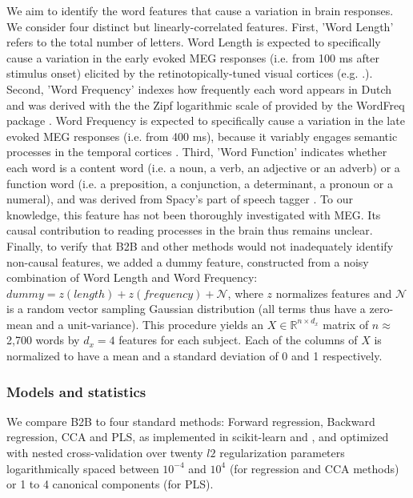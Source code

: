 We aim to identify the word features that cause a variation in brain responses.
We consider four distinct but linearly-correlated features.
%
First, 'Word Length' refers to the total number of letters. Word Length is
expected to specifically cause a variation in the early evoked MEG responses
(i.e. from 100 ms after stimulus onset) elicited by the retinotopically-tuned
visual cortices (e.g. \citep{pegado2014timing}.).
%
Second, 'Word Frequency' indexes how frequently each word appears in Dutch and
was derived with the the Zipf logarithmic scale of \citep{van2014subtlex}
provided by the WordFreq package \citep{speerwordfreq}. Word Frequency is
expected to specifically cause a variation in the late evoked MEG responses
(i.e. from 400 ms), because it variably engages semantic processes in the
temporal cortices \citep{kutas2011thirty}.
%
Third, 'Word Function' indicates whether each word is a content word (i.e. a
noun, a verb, an adjective or an adverb) or a function word (i.e. a preposition,
a conjunction, a determinant, a pronoun or a numeral), and was derived from
Spacy's part of speech tagger \citep{spacy2}. To our knowledge, this feature has
not been thoroughly investigated with MEG. Its causal contribution to reading
processes in the brain thus remains unclear.
%
Finally, to verify that B2B and other methods would not inadequately identify
non-causal features, we added a dummy feature, constructed from a noisy
combination of Word Length and Word Frequency: $dummy = z(length) + z(frequency)
+ \mathcal{N}$, where $z$ normalizes features and $\mathcal{N}$ is a random
vector sampling Gaussian distribution (all terms thus have a zero-mean and a
unit-variance). This procedure yields an $X \in \mathbb{R}^{n \times d_x}$
matrix of $n\approx$ 2,700 words by $d_x=4$ features for each subject. Each of
the columns of $X$ is normalized to have a mean and a standard deviation of 0
and 1 respectively.

\subsubsection{Models and statistics}

We compare B2B to four standard methods: Forward regression, Backward
regression, CCA and PLS, as implemented in scikit-learn \citep{sklearn} and
\citep{bilenko2016pyrcca}, and optimized with nested cross-validation over
twenty $l2$ regularization parameters logarithmically spaced between $10^{-4}$
and $10^4$ (for regression and CCA methods) or 1 to 4 canonical components (for
PLS).

